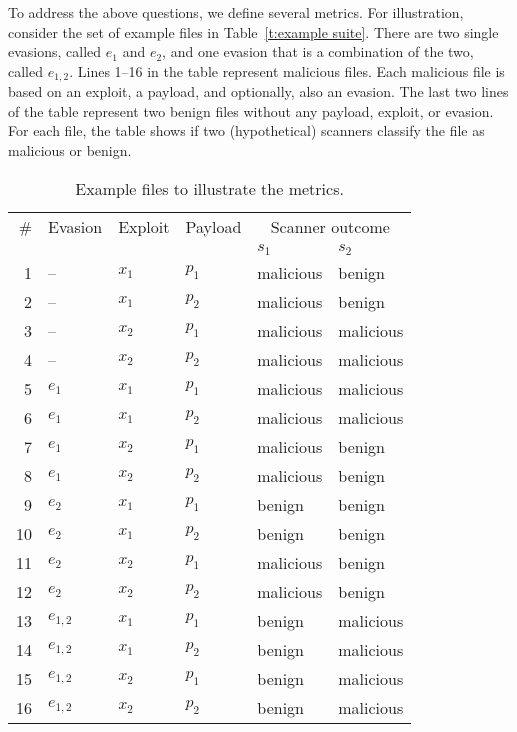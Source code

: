 To address the above questions, we define several metrics.
For illustration, consider the set of example files in Table~\ref{t:example suite}.
There are two single evasions, called $e_1$ and $e_2$, and one evasion that is a combination of the two, called $e_{1,2}$.
Lines 1--16 in the table represent malicious files.
Each malicious file is based on an exploit, a payload, and optionally, also an evasion.
The last two lines of the table represent two benign files without any payload, exploit, or evasion.
For each file, the table shows if two (hypothetical) scanners classify the file as malicious or benign.

\begin{table}[tb]
\centering
\caption{Example files to illustrate the metrics.}
\setlength{\tabcolsep}{7pt}
\footnotesize
\begin{tabular}{rlllll}
\toprule
\# & Evasion & Exploit & Payload & \multicolumn{2}{c}{Scanner outcome} \\
\cmidrule{5-6}
&&&& $s_1$ & $s_2$ \\
\midrule
1   &   --      &   $x_1$   &   $p_1$   &   malicious   & benign    \\
2   &   --      &   $x_1$   &   $p_2$   &   malicious   & benign    \\
3   &   --      &   $x_2$   &   $p_1$   &   malicious   & malicious    \\
4   &   --      &   $x_2$   &   $p_2$   &   malicious   & malicious    \\

5   &   $e_{1}$      &   $x_1$   &   $p_1$   &   malicious   & malicious    \\
6   &   $e_{1}$      &   $x_1$   &   $p_2$   &   malicious   & malicious    \\
7   &   $e_{1}$      &   $x_2$   &   $p_1$   &   malicious   & benign    \\
8   &   $e_{1}$      &   $x_2$   &   $p_2$   &   malicious   & benign    \\

9   &   $e_{2}$      &   $x_1$   &   $p_1$   &   benign   & benign    \\
10   &   $e_{2}$      &   $x_1$   &   $p_2$   &   benign   & benign    \\
11   &   $e_{2}$      &   $x_2$   &   $p_1$   &   malicious   & benign    \\
12   &   $e_{2}$      &   $x_2$   &   $p_2$   &   malicious   & benign    \\

13   &   $e_{1,2}$      &   $x_1$   &   $p_1$   &   benign   & malicious    \\
14   &   $e_{1,2}$      &   $x_1$   &   $p_2$   &   benign   & malicious    \\
15   &   $e_{1,2}$      &   $x_2$   &   $p_1$   &   benign   & malicious    \\
16   &   $e_{1,2}$      &   $x_2$   &   $p_2$   &   benign   & malicious    \\


\end{tabular}
\end{table}
